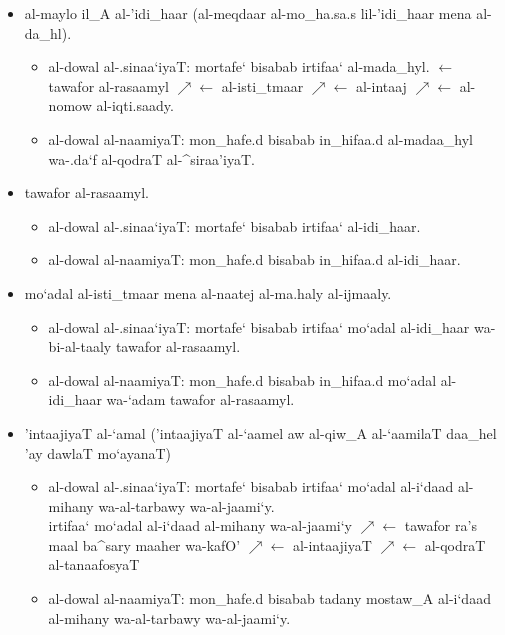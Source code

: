 \begin{itemize}
    \item al-maylo il_A al-'idi_haar (al-meqdaar al-mo_ha.sa.s lil-'idi_haar
        mena al-da_hl).
    \begin{itemize}
        \item al-dowal al-.sinaa`iyaT: mortafe` bisabab irtifaa` al-mada_hyl.
            $\leftarrow$ tawafor al-rasaamyl
            $\nearrow\leftarrow$ al-isti_tmaar
            $\nearrow\leftarrow$ al-intaaj
            $\nearrow\leftarrow$ al-nomow al-iqti.saady.
        \item al-dowal al-naamiyaT: mon_hafe.d bisabab in_hifaa.d al-madaa_hyl
            wa-.da`f al-qodraT al-^siraa'iyaT.
    \end{itemize}
\end{itemize}
\begin{itemize}
    \item tawafor al-rasaamyl.
    \begin{itemize}
        \item al-dowal al-.sinaa`iyaT: mortafe` bisabab irtifaa` al-idi_haar.
        \item al-dowal al-naamiyaT: mon_hafe.d bisabab in_hifaa.d al-idi_haar.
    \end{itemize}
\end{itemize}
\begin{itemize}
    \item mo`adal al-isti_tmaar mena al-naatej al-ma.haly al-ijmaaly.
    \begin{itemize}
        \item al-dowal al-.sinaa`iyaT: mortafe` bisabab irtifaa` mo`adal
            al-idi_haar wa-bi-al-taaly tawafor al-rasaamyl.
        \item al-dowal al-naamiyaT: mon_hafe.d bisabab in_hifaa.d mo`adal
            al-idi_haar wa-`adam tawafor al-rasaamyl.
    \end{itemize}
\end{itemize}
\begin{itemize}
    \item 'intaajiyaT al-`amal ('intaajiyaT al-`aamel aw al-qiw_A al-`aamilaT
        daa_hel 'ay dawlaT mo`ayanaT)
    \begin{itemize}
        \item al-dowal al-.sinaa`iyaT: mortafe` bisabab irtifaa` mo`adal
            al-i`daad al-mihany wa-al-tarbawy wa-al-jaami`y.\\ 
            irtifaa` mo`adal al-i`daad al-mihany wa-al-jaami`y
            $\nearrow\leftarrow$ tawafor ra's maal ba^sary maaher wa-kafO'
            $\nearrow\leftarrow$ al-intaajiyaT
            $\nearrow\leftarrow$ al-qodraT al-tanaafosyaT
        \item al-dowal al-naamiyaT: mon_hafe.d bisabab tadany mostaw_A
            al-i`daad al-mihany wa-al-tarbawy wa-al-jaami`y.
    \end{itemize}
\end{itemize}
